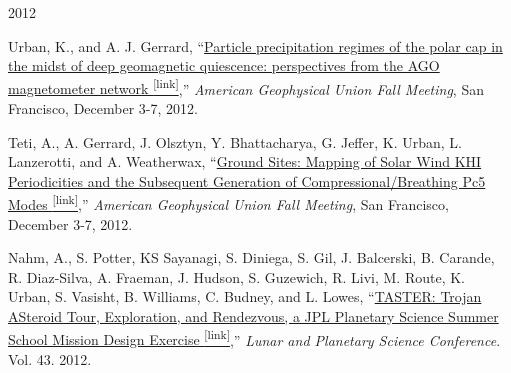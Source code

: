 \vspace{0.5cm}
\begin{center} \Large{2012} \end{center}
\normalsize
\begin{itemize*}
  \item Urban, K., and A. J. Gerrard,
    ``\href{https://scholar.google.com/citations?view_op=view_citation&hl=en&user=KTLuoQkAAAAJ&citation_for_view=KTLuoQkAAAAJ:Se3iqnhoufwC}{Particle precipitation regimes of the polar
    cap in the midst of deep geomagnetic quiescence: perspectives from the
    AGO magnetometer network \textsuperscript{\tiny{[link]}}},'' {\em American Geophysical Union Fall
    Meeting}, San Francisco, December 3-7, 2012.

  \item Teti, A., A. Gerrard, J. Olsztyn, Y. Bhattacharya, G.
    Jeffer, K. Urban, L. Lanzerotti, and A. Weatherwax,
    ``\href{https://scholar.google.com/citations?view_op=view_citation&hl=en&user=KTLuoQkAAAAJ&citation_for_view=KTLuoQkAAAAJ:UebtZRa9Y70C}{Ground
    Sites: Mapping of Solar Wind KHI Periodicities and the Subsequent
    Generation of Compressional/Breathing Pc5 Modes \textsuperscript{\tiny{[link]}}},''
    {\em American Geophysical Union Fall
    Meeting}, San Francisco, December 3-7, 2012.

  \item
    Nahm, A., S. Potter, KS Sayanagi, S. Diniega, S. Gil, J. Balcerski,
    B.  Carande, R. Diaz-Silva, A. Fraeman, J. Hudson, S. Guzewich, R.
    Livi, M.  Route, K. Urban, S. Vasisht, B. Williams, C. Budney, and L. Lowes,
    ``\href{https://scholar.google.com/citations?view_op=view_citation&hl=en&user=KTLuoQkAAAAJ&citation_for_view=KTLuoQkAAAAJ:Tyk-4Ss8FVUC}{TASTER:
    Trojan ASteroid Tour, Exploration, and Rendezvous, a JPL Planetary
    Science Summer School Mission Design Exercise \textsuperscript{\tiny{[link]}}},'' {\em Lunar and
    Planetary Science Conference}. Vol. 43. 2012.
\end{itemize*}




